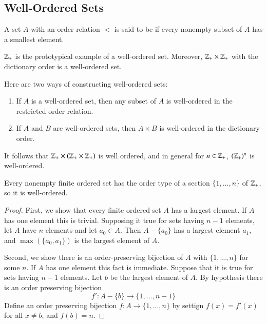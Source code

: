 \documentclass[12pt, a4paper, oneside, openright, titlepage]{book}
\begin{document}
\begin{appendices}
    \section{Well-Ordered Sets}

    
    \begin{defn}
        A set $A$ with an order relation $<$ is said to be  if every nonempty subset of $A$ has a smallest element.
    \end{defn}

    \begin{eg}
        $\mathbb Z_+$ is the prototypical example of a well-ordered set. Moreover, $\mathbb Z_+\times \mathbb Z_+$ with the dictionary order is a well-ordered set.
    \end{eg}

    \begin{rmk}
        Here are two ways of constructing well-ordered sets:\begin{enumerate}
            \item If $A$ is a well-ordered set, then any subset of $A$ is well-ordered in the restricted order relation.
            \item If $A$ and $B$ are well-ordered sets, then $A\times B$ is well-ordered in the dictionary order.
        \end{enumerate}
        It follows that $\mathbb Z_+\times(\mathbb Z_+\times \mathbb Z_+)$ is well ordered, and in general for $n \in \mathbb Z_+$, $(\mathbb Z_+)^n$ is well-ordered.
    \end{rmk}

    \begin{thm}
        Every nonempty finite ordered set has the order type of a section $\{1,...,n\}$ of $\mathbb Z_+$, so it is well-ordered.
    \end{thm}
    \begin{proof}
        First, we show that every finite ordered set $A$ has a largest element. If $A$ has one element this is trivial. Supposing it true for sets having $n-1$ elements, let $A$ have $n$ elements and let $a_0 \in A$. Then $A-\{a_0\}$ has a largest element $a_1$, and $\max(\{a_0,a_1\})$ is the largest element of $A$.


        Second, we show there is an order-preserving bijection of $A$ with $\{1,...,n\}$ for some $n$. If $A$ has one element this fact is immediate. Suppose that it is true for sets having $n-1$ elements. Let $b$ be the largest element of $A$. By hypothesis there is an order preserving bijection \begin{equation*}
            f':A-\{b\}\rightarrow \{1,...,n-1\}
        \end{equation*}
        Define an order preserving bijection $f:A\rightarrow \{1,...,n\}$ by settign $f(x) = f'(x)$ for all $x \neq b$, and $f(b) = n$.
    \end{proof}


\end{appendices}
\end{document}
